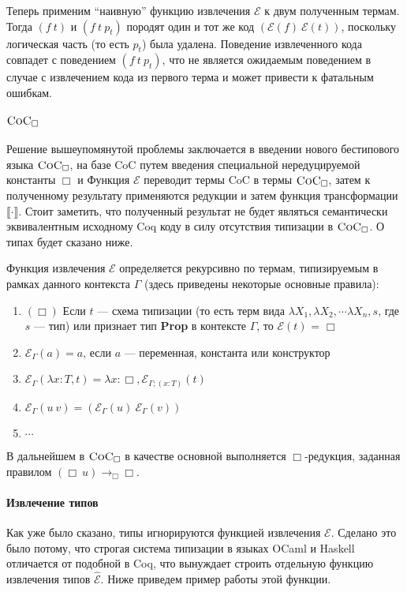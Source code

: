 Теперь применим ``наивную'' функцию извлечения $\mathcal{E}$ к двум полученным термам. Тогда $(f\ t)$ и $(f\ t\ p_t)$ породят один и тот же код $(\mathcal{E}(f)\ \mathcal{E}(t))$, поскольку логическая часть (то есть $p_t$) была удалена. Поведение извлеченного кода совпадет с поведением $(f\ t\ p_t)$, что не является ожидаемым поведением в случае с извлечением кода из первого терма и может привести к фатальным ошибкам.

\paragraph{$\textsc{CoC}_\Box$}

Решение вышеупомянутой проблемы заключается в введении нового бестипового языка $\textsc{CoC}_\Box$, на базе CoC путем введения специальной нередуцируемой константы $\Box$ и  Функция $\mathcal{E}$ переводит термы CoC в термы $\textsc{CoC}_\Box$, затем к полученному результату применяются редукции и затем функция трансформации $\llbracket \cdot \rrbracket$. Стоит заметить, что полученный результат не будет являться семантически эквивалентным исходному Coq коду в силу отсутствия типизации в $\textsc{CoC}_\Box$. О типах будет сказано ниже.

Функция извлечения $\mathcal{E}$ определяется рекурсивно по термам, типизируемым в рамках данного контекста $\Gamma$ (здесь приведены некоторые основные правила):
\begin{enumerate}
\item $(\Box)$ Если $t$ --- схема типизации (то есть терм вида $\lambda X_1, \lambda X_2, \cdots \lambda X_n, s$, где $s$ --- тип) или признает тип \textbf{Prop} в контексте $\Gamma$, то $\mathcal{E}(t)$ = $\Box$
\item $\mathcal{E}_{\Gamma}(a) = a$, если $a$ --- переменная, константа или конструктор
\item $\mathcal{E}_{\Gamma}(\lambda x:T, t) = \lambda x :\Box, \mathcal{E}_{\Gamma;(x:T)} (t)$
\item $\mathcal{E}_{\Gamma} (u\ v) = (\mathcal{E}_{\Gamma} (u)\ \mathcal{E}_{\Gamma} (v))$
\item $\cdots$
\end{enumerate}

В дальнейшем в $\textsc{CoC}_\Box$ в качестве основной выполняется $\Box$-редукция, заданная правилом $(\Box\ u) \rightarrow_{\Box} \Box$.

\paragraph{Извлечение типов} Как уже было сказано, типы игнорируются функцией извлечения $\mathcal{E}$. Сделано это было потому, что строгая система типизации в языках OCaml и Haskell отличается от подобной в Coq, что вынуждает строить отдельную функцию извлечения типов $\hat{\mathcal{E}}$. Ниже приведем пример работы этой функции.

